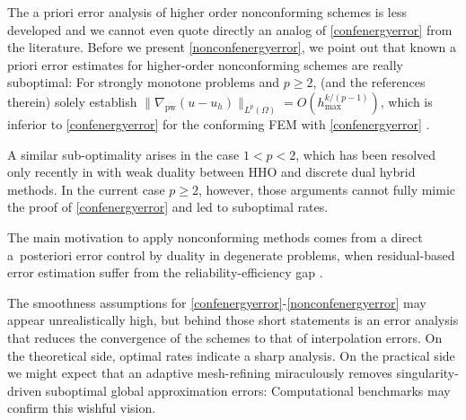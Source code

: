 \documentclass[a4paper]{amsart}
\numberwithin{equation}{section}
\newcommand{\pw}{\mathrm{pw}}
\theoremstyle{remark}
\begin{document}
The a priori error analysis of higher order nonconforming schemes is less developed
and we cannot even quote directly an analog of \eqref{confenergyerror} from the literature. Before
we present  \eqref{nonconfenergyerror},
we point out  that known  a priori error estimates for higher-order nonconforming schemes are  
really suboptimal:  For strongly monotone problems and $p\ge 2$,
\cite{DiPietroDroniou2017-II,DroniouEymardGallouet2018} 
(and the references therein) solely 
establish 
$\|\nabla_\pw(u-u_h)\|_{L^p(\Omega)} =O(h_{\max}^{k/(p-1)})$,
which is inferior to \eqref{confenergyerror}
for the
conforming FEM with \eqref{confenergyerror} \cite{Chow1989}.

A similar sub-optimality  arises in the case $1 < p < 2$, which has been resolved only recently in \cite{Tran2024} with weak duality 
between HHO and discrete dual hybrid methods.
In the current case $p\ge 2$, however, those
arguments cannot fully mimic the proof of 
\eqref{confenergyerror} and led  to suboptimal rates.

The main motivation to apply nonconforming methods comes from a direct 
a~posteriori error control by duality 
\cite{Repin1997,Repin2000,NeittaanmakiRepin2004,CLiu2015,Bartels2015} in 
degenerate problems, 
when residual-based error estimation suffer from the reliability-efficiency gap \cite{CJochimsen2003}.


The smoothness assumptions for  \eqref{confenergyerror}-\eqref{nonconfenergyerror} may appear unrealistically high,
but behind those short statements is an error analysis that reduces the convergence of the schemes to that of
interpolation errors. On the theoretical side, optimal rates indicate a sharp analysis. On the practical side
we might expect that an adaptive mesh-refining miraculously  removes singularity-driven suboptimal global 
approximation errors: Computational benchmarks may confirm this wishful vision.
\end{document}
